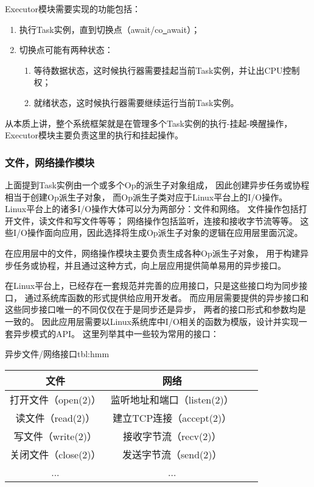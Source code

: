 \documentclass[supercite]{HustGraduPaper}
\theoremstyle{definition}
\begin{document}
Executor模块需要实现的功能包括：

\begin{enumerate}
  \item 执行Task实例，直到切换点（await/co\underline{~}await）；
  \item 切换点可能有两种状态：
    \begin{enumerate}
      \item 等待数据状态，这时候执行器需要挂起当前Task实例，并让出CPU控制权；
      \item 就绪状态，这时候执行器需要继续运行当前Task实例。
    \end{enumerate}
\end{enumerate}

从本质上讲，整个系统框架就是在管理多个Task实例的执行-挂起-唤醒操作，
Executor模块主要负责这里的执行和挂起操作。\par

\subsubsection{文件，网络操作模块}
上面提到Task实例由一个或多个Op的派生子对象组成，
因此创建异步任务或协程相当于创建Op派生子对象，
而Op派生子类对应于Linux平台上的I/O操作。
Linux平台上的诸多I/O操作大体可以分为两部分：文件和网络。
文件操作包括打开文件，读文件和写文件等等；
网络操作包括监听，连接和接收字节流等等。
这些I/O操作面向应用，因此选择将生成Op派生子对象的逻辑在应用层里面沉淀。\par

在应用层中的文件，网络操作模块主要负责生成各种Op派生子对象，
用于构建异步任务或协程，并且通过这种方式，向上层应用提供简单易用的异步接口。\par

在Linux平台上，已经存在一套规范并完善的应用接口，只是这些接口均为同步接口，
通过系统库函数的形式提供给应用开发者。
而应用层需要提供的异步接口和这些同步接口唯一的不同仅仅在于是同步还是异步，
两者的接口形式和参数均是一致的。
因此应用层需要以Linux系统库中I/O相关的函数为模版，设计并实现一套异步模式的API。
这里列举其中一些较为常用的接口：

\begin{generaltab}{异步文件/网络接口}{tbl:hmm}
  \begin{tabular}{c|ccc}
    \toprule
    文件 & 网络 \\
    \midrule
    打开文件（open(2)） & 监听地址和端口（listen(2)） \\
    读文件（read(2)） & 建立TCP连接（accept(2)） \\
    写文件（write(2)） & 接收字节流（recv(2)） \\
    关闭文件（close(2)） & 发送字节流（send(2)） \\
    ... & ... \\
    \bottomrule
  \end{tabular}
\end{generaltab}
\end{document}

